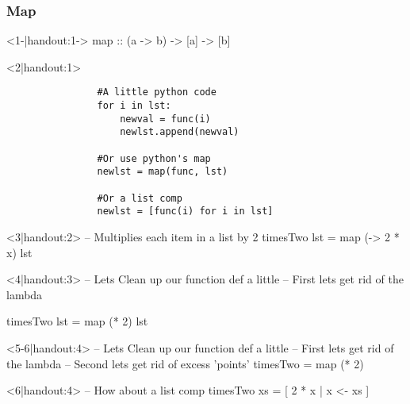 \begin{frame}[t,fragile]
    \frametitle{Map}
    \begin{overprint}
        \begin{hscode}<1-|handout:1->
            map :: (a -> b) -> [a] -> [b]
        \end{hscode}
        \begin{onlyenv}<2|handout:1>
            \begin{verbatim}
                #A little python code
                for i in lst:
                    newval = func(i)
                    newlst.append(newval)

                #Or use python's map
                newlst = map(func, lst)

                #Or a list comp
                newlst = [func(i) for i in lst]
            \end{verbatim}
        \end{onlyenv}

        \begin{hscode}<3|handout:2>
            -- Multiplies each item in a list by 2
            timesTwo lst = map (\x -> 2 * x) lst
        \end{hscode}

        \begin{hscode}<4|handout:3>
            -- Lets Clean up our function def a little
            -- First lets get rid of the lambda

            timesTwo lst = map (* 2) lst
        \end{hscode}

        \begin{hscode}<5-6|handout:4>
            -- Lets Clean up our function def a little
            -- First lets get rid of the lambda
            -- Second lets get rid of excess 'points'
            timesTwo = map (* 2)
        \end{hscode}

        \begin{hscode}<6|handout:4>
            -- How about a list comp
            timesTwo xs = [ 2 * x | x <- xs ]
        \end{hscode}

    \end{overprint}
\end{frame}

